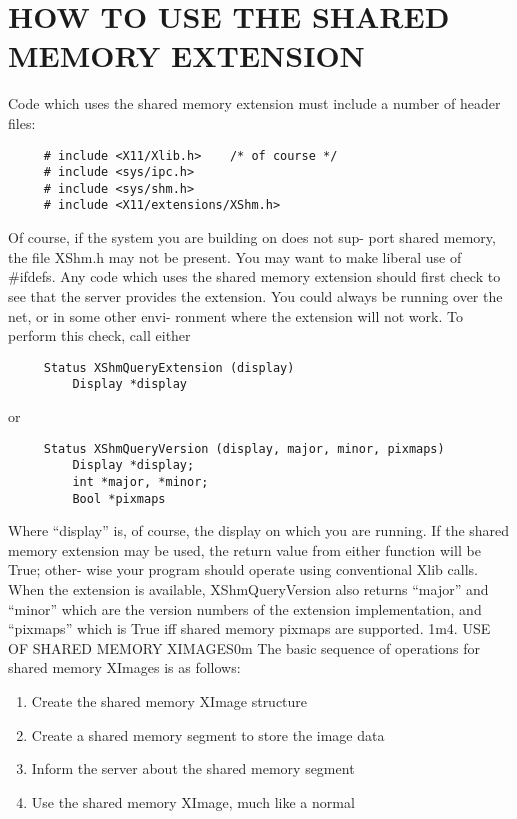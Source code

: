 \documentclass{article}
\begin{document}
\section{HOW TO USE THE SHARED MEMORY EXTENSION}
Code which uses the shared memory extension must include a
number of header files:
\begin{verbatim}
     # include <X11/Xlib.h>	   /* of course */
     # include <sys/ipc.h>
     # include <sys/shm.h>
     # include <X11/extensions/XShm.h>
\end{verbatim}

Of course, if the system you are building on does not sup-
port shared memory, the file XShm.h may not be present.	 You
may want to make liberal use of \#ifdefs.
Any code which uses the shared memory extension should first
check to see that the server provides the extension.  You
could always be running over the net, or in some other envi-
ronment where the extension will not work.  To perform this
check, call either
\begin{verbatim}
     Status XShmQueryExtension (display)
	     Display *display
\end{verbatim}

or

\begin{verbatim}
     Status XShmQueryVersion (display, major, minor, pixmaps)
	     Display *display;
	     int *major, *minor;
	     Bool *pixmaps
\end{verbatim}

Where ``display'' is, of course, the display on which you
are running.  If the shared memory extension may be used,
the return value from either function will be True; other-
wise your program should operate using conventional Xlib
calls.	When the extension is available, XShmQueryVersion
also returns ``major'' and ``minor'' which are the version
numbers of the extension implementation, and ``pixmaps''
which is True iff shared memory pixmaps are supported.
1m4.  USE OF SHARED MEMORY XIMAGES0m
The basic sequence of operations for shared memory XImages
is as follows:

\begin{enumerate}
\item Create the shared memory XImage structure
\item Create a shared memory segment to store the image
data
\item Inform the server about the shared memory segment
\item Use the shared memory XImage, much like a normal
\end{enumerate}
\end{document}
